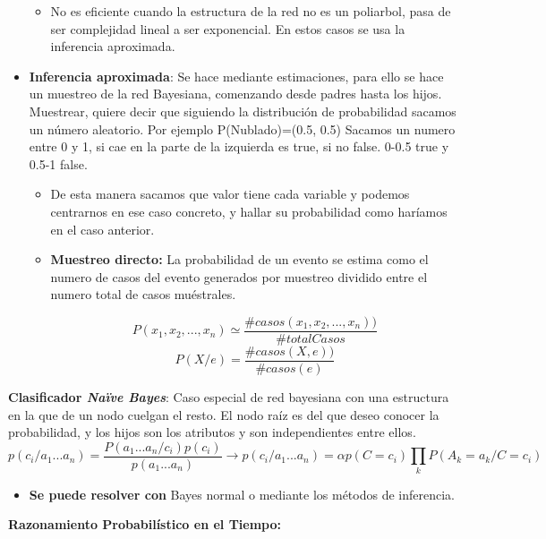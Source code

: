 \documentclass[12pt, twoside, openright]{report} %
\begin{document}
\begin{itemize}
\begin{itemize}
    \item No es eficiente cuando la estructura de la red no es un poliarbol,
      pasa de ser complejidad lineal a ser exponencial. En estos casos
      se usa la inferencia aproximada.
      
    \end{itemize}
  \item \textbf{Inferencia aproximada}: Se hace mediante estimaciones, para
    ello se hace un muestreo de la red Bayesiana, comenzando desde
    padres hasta los hijos. Muestrear, quiere decir que siguiendo la
    distribución de probabilidad sacamos un número aleatorio. Por
    ejemplo P(Nublado)=(0.5, 0.5) Sacamos un numero entre 0 y 1, si cae
    en la parte de la izquierda es true, si no false. 0-0.5 true y 0.5-1
    false.
    

    \begin{itemize}
    \item De esta manera sacamos que valor tiene cada variable y podemos
      centrarnos en ese caso concreto, y hallar su probabilidad como
      haríamos en el caso anterior.
      
    \item \textbf{Muestreo directo:} La probabilidad de un evento se estima
      como el numero de casos del evento generados por muestreo dividido
      entre el numero total de casos muéstrales.
      
	  $$P(x_1, x_2, ..., x_n) \simeq \frac{\#casos(x_1, x_2, ..., x_n))}{\#total Casos}$$
	  $$P(X/e) = \frac{\#casos(X, e))}{\#casos(e)}$$

    \end{itemize}
  \end{itemize}

 
  \textbf{Clasificador \emph{Naïve Bayes}}: Caso especial de red
  bayesiana con una estructura en la que de un nodo cuelgan el resto. El
  nodo raíz es del que deseo conocer la probabilidad, y los hijos son
  los atributos y son independientes entre ellos.
  $$p(c_i/a_1 ... a_n)= \frac{P(a_1 ... a_n / c_i)p(c_i)}{p(a_1 ... a_n)} \rightarrow p(c_i/a_1 ... a_n)= \alpha p(C= c_i) \prod_k P(A_k = a_k / C= c_i)$$
  \begin{itemize}
  \item \textbf{Se puede resolver con} Bayes normal o mediante los métodos
    de inferencia.
    
  \end{itemize}

  


  \textbf{Razonamiento Probabilístico en el Tiempo:}
\end{document}
